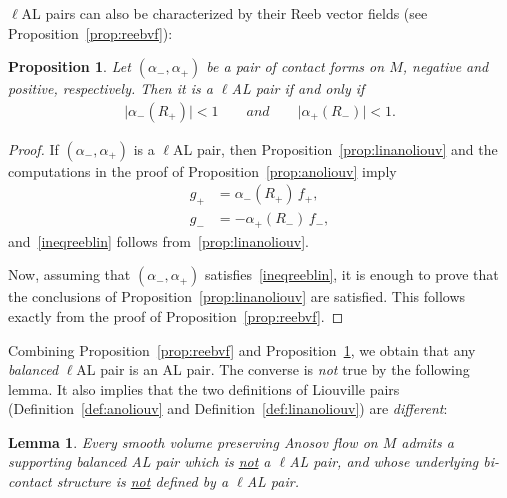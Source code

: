 \documentclass[letterpaper, 11pt]{article}
\numberwithin{equation}{section}
\newtheorem{lem}[thm]{Lemma}
\newtheorem{prop}[thm]{Proposition}
\begin{document}
$\ell$AL pairs can also be characterized by their Reeb vector fields (see Proposition~\ref{prop:reebvf}):

\begin{prop} \label{prop:reebvflin}
Let $(\alpha_-, \alpha_+)$ be a pair of contact forms on $M$, negative and positive, respectively. Then it is a $\ell$AL pair if and only if
\begin{align} \label{ineqreeblin}
\vert \alpha_-(R_+)\vert < 1 \qquad and \qquad \vert \alpha_+(R_-)\vert <1.
\end{align}
\end{prop}

\begin{proof}
If $(\alpha_-, \alpha_+)$ is a $\ell$AL pair, then Proposition~\ref{prop:linanoliouv} and the computations in the proof of Proposition~\ref{prop:anoliouv} imply
\begin{align*}
g_+ &= \alpha_-(R_+)\, f_+, \\
g_- &= - \alpha_+(R_-)\, f_-,
\end{align*}
and~\eqref{ineqreeblin} follows from~\eqref{prop:linanoliouv}.

Now, assuming that $(\alpha_-, \alpha_+)$ satisfies~\eqref{ineqreeblin}, it is enough to prove that the conclusions of Proposition~\ref{prop:linanoliouv} are satisfied. This follows exactly from the proof of Proposition~\ref{prop:reebvf}.
\end{proof}

Combining Proposition~\ref{prop:reebvf} and Proposition~\ref{prop:reebvflin}, we obtain that any \emph{balanced} $\ell$AL pair is an AL pair. The converse is \emph{not} true by the following lemma. It also implies that the two definitions of Liouville pairs (Definition~\ref{def:anoliouv} and Definition~\ref{def:linanoliouv}) are \emph{different}:

\begin{lem} \label{lem:alvslal}
Every smooth volume preserving Anosov flow on $M$ admits a supporting balanced AL pair which is \underline{not} a $\ell$AL pair, and whose underlying bi-contact structure is \underline{not} defined by a $\ell$AL pair.
\end{lem}
\end{document}
